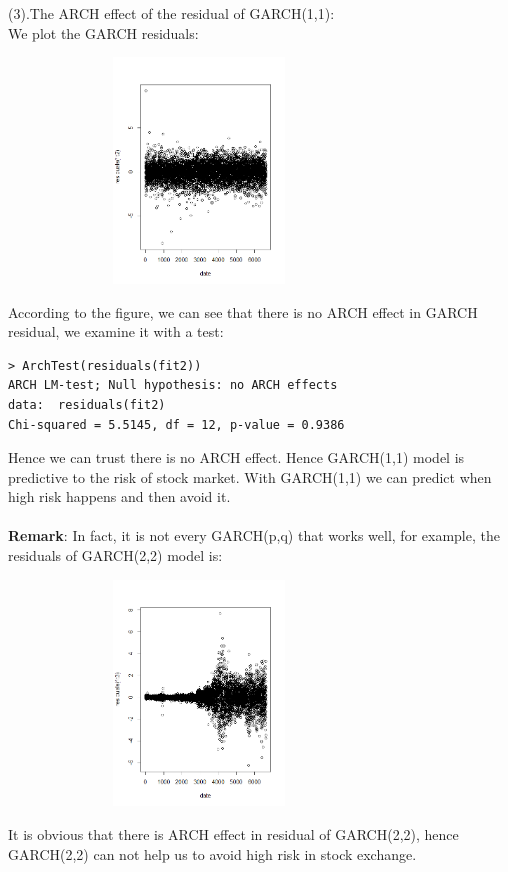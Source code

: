 \documentclass[twoside,11pt]{article}
\begin{document}
\noindent (3).The ARCH effect of the residual of GARCH(1,1):\\
We plot the GARCH residuals:
\begin {figure}[h]
\centering
\includegraphics[width=8cm,height=6cm]{NYSE_res2.png}
\end {figure}
\noindent According to the figure, we can see that there is no ARCH effect in GARCH residual, we examine it with a test:
\begin{verbatim}
> ArchTest(residuals(fit2))
ARCH LM-test; Null hypothesis: no ARCH effects
data:  residuals(fit2)
Chi-squared = 5.5145, df = 12, p-value = 0.9386
\end{verbatim}
\noindent Hence we can trust there is no ARCH effect. Hence GARCH(1,1) model is predictive to the risk of stock market. With GARCH(1,1) we can predict when high risk happens and then avoid it.\\
\\
\textbf{Remark}:
In fact, it is not every GARCH(p,q) that works well, for example, the residuals of GARCH(2,2) model is:
\begin {figure}[h]
\centering
\includegraphics[width=8cm,height=6cm]{NYSE_res3.png}
\end {figure}
\noindent It is obvious that there is ARCH effect in residual of GARCH(2,2), hence GARCH(2,2) can not help us to avoid high risk in stock exchange.
\end{document}
